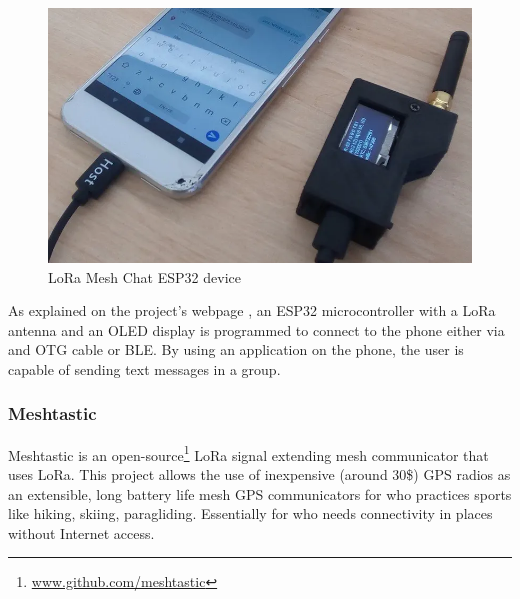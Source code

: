 				\noindent
				\begin{minipage}{0.6\textwidth}%
					\begin{figure}[H]
						\centering
						\includegraphics[width=.9\textwidth]{resources/img/chap4/lora-mesh-chat-5267d9}
						\caption{LoRa Mesh Chat ESP32 device}
						\label{img:lora_mesh_chat}
					\end{figure}
				\end{minipage}%
				\hfill%
				\begin{minipage}{0.4\textwidth}\raggedright
					As explained on the project's webpage \footnotemark, an ESP32 microcontroller with a LoRa antenna and an OLED display is programmed to connect to the phone either via and OTG cable or BLE.
					By using an application on the phone, the user is capable of sending text messages in a group.
				\end{minipage}			
				
				\subsubsection{Meshtastic}\label{subsubsec:meshtastic}
	
					Meshtastic is an open-source\footnote{ \url{www.github.com/meshtastic}} LoRa signal extending mesh communicator that uses LoRa.
					This project allows the use of inexpensive (around $30$\$) GPS radios as an extensible, long battery life mesh GPS communicators for who practices sports like hiking, skiing, paragliding.
					Essentially for who needs connectivity in places without Internet access.
					
